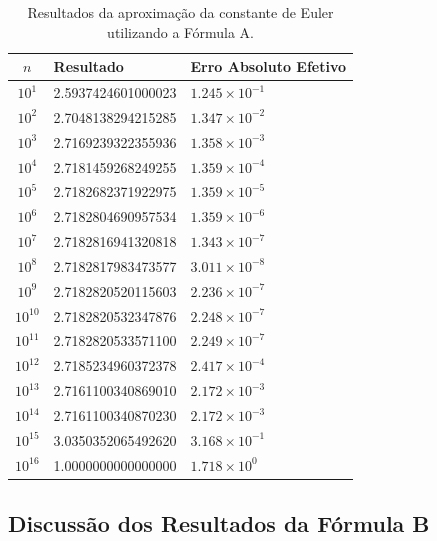 \documentclass{article}
\begin{document}
\begin{table}[H]
    \centering
    \begin{tabular}{|c|l|l|}
        \hline
        \textbf{$n$} & \textbf{Resultado} & \textbf{Erro Absoluto Efetivo} \\ \hline
        $10^{1}$  & 2.5937424601000023 & $1.245 \times 10^{-1}$ \\ \hline
        $10^{2}$  & 2.7048138294215285 & $1.347 \times 10^{-2}$ \\ \hline
        $10^{3}$  & 2.7169239322355936 & $1.358 \times 10^{-3}$ \\ \hline
        $10^{4}$  & 2.7181459268249255 & $1.359 \times 10^{-4}$ \\ \hline
        $10^{5}$  & 2.7182682371922975 & $1.359 \times 10^{-5}$ \\ \hline
        $10^{6}$  & 2.7182804690957534 & $1.359 \times 10^{-6}$ \\ \hline
        $10^{7}$  & 2.7182816941320818 & $1.343 \times 10^{-7}$ \\ \hline
        $10^{8}$  & 2.7182817983473577 & $3.011 \times 10^{-8}$ \\ \hline
        $10^{9}$  & 2.7182820520115603 & $2.236 \times 10^{-7}$ \\ \hline
        $10^{10}$ & 2.7182820532347876 & $2.248 \times 10^{-7}$ \\ \hline
        $10^{11}$ & 2.7182820533571100 & $2.249 \times 10^{-7}$ \\ \hline
        $10^{12}$ & 2.7185234960372378 & $2.417 \times 10^{-4}$ \\ \hline
        $10^{13}$ & 2.7161100340869010 & $2.172 \times 10^{-3}$ \\ \hline
        $10^{14}$ & 2.7161100340870230 & $2.172 \times 10^{-3}$ \\ \hline
        $10^{15}$ & 3.0350352065492620 & $3.168 \times 10^{-1}$ \\ \hline
        $10^{16}$ & 1.0000000000000000 & $1.718 \times 10^{0}$  \\ \hline
    \end{tabular}
    \vspace{0.2cm}
    \caption{Resultados da aproximação da constante de Euler utilizando a Fórmula A.}
    \label{tab:formula_a}
\end{table}
\pagebreak

\subsection{Discussão dos Resultados da Fórmula B}
\end{document}
